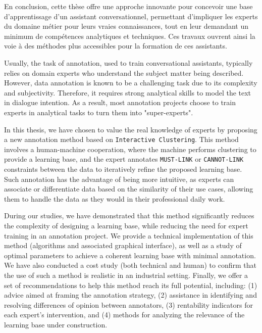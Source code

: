 \begin{ThesisAbstract}
\begin{FrenchAbstract}
		En conclusion, cette thèse offre une approche innovante pour concevoir une base d'apprentissage d'un assistant conversationnel, permettant d'impliquer les experts du domaine métier pour leurs vraies connaissances, tout en leur demandant un minimum de compétences analytiques et techniques.
		Ces travaux ouvrent ainsi la voie à des méthodes plus accessibles pour la formation de ces assistants.
		
	
	\end{FrenchAbstract}
	
	\begin{EnglishAbstract}
		
		Usually, the task of annotation, used to train conversational assistants, typically relies on domain experts who understand the subject matter being described.
		However, data annotation is known to be a challenging task due to its complexity and subjectivity.
		Therefore, it requires strong analytical skills to model the text in dialogue intention.
		As a result, most annotation projects choose to train experts in analytical tasks to turn them into "super-experts".
		
		In this thesis, we have chosen to value the real knowledge of experts by proposing a new annotation method based on \texttt{Interactive Clustering}.
		This method involves a human-machine cooperation, where the machine performs clustering to provide a learning base, and the expert annotates \texttt{MUST-LINK} or \texttt{CANNOT-LINK} constraints between the data to iteratively refine the proposed learning base.
		Such annotation has the advantage of being more intuitive, as experts can associate or differentiate data based on the similarity of their use cases, allowing them to handle the data as they would in their professional daily work.

		During our studies, we have demonstrated that this method significantly reduces the complexity of designing a learning base, while reducing the need for expert training in an annotation project.
		We provide a technical implementation of this method (algorithms and associated graphical interface), as well as a study of optimal parameters to achieve a coherent learning base with minimal annotation.
		We have also conducted a cost study (both technical and human) to confirm that the use of such a method is realistic in an industrial setting.
		Finally, we offer a set of recommendations to help this method reach its full potential, including: (1) advice aimed at framing the annotation strategy, (2) assistance in identifying and resolving differences of opinion between annotators, (3) rentability indicators for each expert's intervention, and (4) methods for analyzing the relevance of the learning base under construction.
		

\end{EnglishAbstract}
\end{ThesisAbstract}
